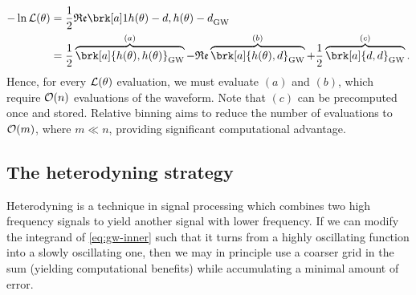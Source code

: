 \begin{align*}\label{}
-\ln \like (\theta) &= \frac{1}{2} \re \brk[a]1{h(\theta) - d,h(\theta) - d}_{\text{GW}} \\
&= \frac{1}{2}\overbrace{\brk[a]{h(\theta), h(\theta)}_{\text{GW}}}^{(a)} - \re \overbrace{\brk[a]{h(\theta), d}_{\text{GW}}}^{(b)} + \frac{1}{2}\overbrace{\brk[a]{d, d}_{\text{GW}}}^{\text(c)}.
\end{align*}
Hence, for every $\mathcal{L}(\theta)$ evaluation, we must evaluate $(a)$ and $(b)$, which require $\mathcal{O}(n)$ evaluations of the waveform.
Note that $(c)$ can be precomputed once and stored.
Relative binning aims to reduce the number of evaluations to $\mathcal{O}(m)$, where $m \ll n$, providing significant computational advantage.


\subsection{The heterodyning strategy}
Heterodyning is a technique in signal processing which combines two high frequency signals to yield another signal with lower frequency.
If we can modify the integrand of \cref{eq:gw-inner} such that it turns from a highly oscillating function into a slowly oscillating one, then we may in principle use a coarser grid in the sum (yielding computational benefits) while accumulating a minimal amount of error.

